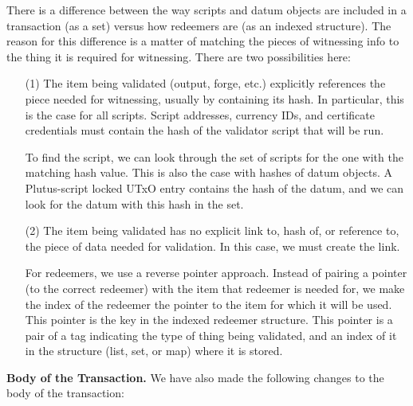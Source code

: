 There is a difference between the way scripts and datum objects are included in
a transaction (as a set) versus how redeemers are
(as an indexed structure). The reason for this difference is a matter of matching
the pieces of witnessing info to the thing it is required for witnessing. There
are two possibilities here:

\begin{itemize}
  \item[(1)] The item being validated (output, forge, etc.) explicitly references
  the piece needed for witnessing, usually by containing its hash.
  In particular, this is the case for all scripts.
  Script addresses, currency IDs, and certificate credentials must contain
  the hash of the validator script that will be run.

  To find the script, we can look through
  the set of scripts for the one with the matching hash value.
  This is also the case with hashes of datum objects. A Plutus-script locked
  UTxO entry contains the hash of the datum, and we can look for
  the datum with this hash in the set.

  \item[(2)] The item being validated has no explicit link to, hash of, or
  reference to, the piece of data needed for validation. In this case, we must create
  the link.

  For redeemers, we use a reverse pointer approach. Instead of pairing
  a pointer (to the correct redeemer) with the item that redeemer is needed for,
  we make the index of the redeemer the pointer to the item for
  which it will be used. This pointer is the key in the indexed redeemer structure.
  This pointer is a pair of a tag indicating the type of
  thing being validated, and an index of it in the structure (list, set, or map)
  where it is stored.
\end{itemize}

\textbf{Body of the Transaction.}
We have also made the following changes to
the body of the transaction:

